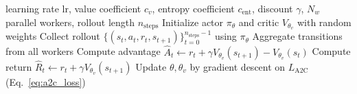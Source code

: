 \begin{algorithm}[!htbp]
\caption{Advantage Actor-Critic (A2C) --- synchronous training loop \cite{Mnih2016}}
\label{alg:a2c}
\begin{algorithmic}
\REQUIRE learning rate $\mathrm{lr}$, value coefficient $c_v$, entropy coefficient $c_{\mathrm{ent}}$, discount $\gamma$, $N_w$ parallel workers, rollout length $n_{\text{steps}}$
\STATE Initialize actor $\pi_\theta$ and critic $V_{\theta_v}$ with random weights
        \STATE Collect rollout $\{(s_t, a_t, r_t, s_{t+1})\}_{t=0}^{n_{\text{steps}}-1}$ using $\pi_\theta$
    \ENDFOR
    \STATE Aggregate transitions from all workers
        \STATE Compute advantage $\hat{A}_t \leftarrow r_t + \gamma V_{\theta_v}(s_{t+1}) - V_{\theta_v}(s_t)$
        \STATE Compute return $\hat{R}_t \leftarrow r_t + \gamma V_{\theta_v}(s_{t+1})$
    \ENDFOR
    \STATE Update $\theta, \theta_v$ by gradient descent on $L_{\text{A2C}}$ (Eq.~\eqref{eq:a2c_loss})
\ENDFOR
\end{algorithmic}
\end{algorithm}

